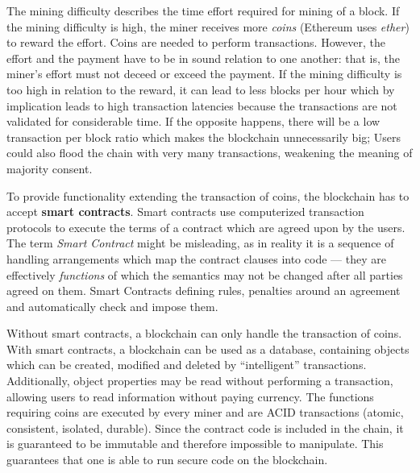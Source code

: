The mining difficulty describes the time effort required for mining of a block.
If the mining difficulty is high, the miner receives more \emph{coins} (Ethereum uses \emph{ether}) to reward the effort.
Coins are needed to perform transactions.
However, the effort and the payment have to be in sound relation to one another: that is, the miner's effort must not deceed or exceed the payment.
If the mining difficulty is too high in relation to the reward, it can lead to less blocks per hour which by implication leads to high transaction latencies because the transactions are not validated for considerable time.
If the opposite happens, there will be a low transaction per block ratio which makes the blockchain unnecessarily big; Users could also flood the chain with very many transactions, weakening the meaning of majority consent.\newline\newline

To provide functionality extending the transaction of coins, the blockchain has to accept \textbf{smart contracts}.
Smart contracts use computerized transaction protocols to execute the terms of a contract which are agreed upon by the users.
The term \emph{Smart Contract} might be misleading, as in reality it is a sequence of handling arrangements which map the contract clauses into code \cite{ecolex} --- they are effectively \emph{functions} of which the semantics may not be changed after all parties agreed on them.
Smart Contracts defining rules, penalties around an agreement and automatically check and impose them.

Without smart contracts, a blockchain can only handle the transaction of coins.
With smart contracts, a blockchain can be used as a database, containing objects which can be created, modified and deleted by \enquote{intelligent} transactions.
Additionally, object properties may be read without performing a transaction, allowing users to read information without paying currency.
The functions requiring coins are executed by every miner and are ACID transactions (atomic, consistent, isolated, durable).
Since the contract code is included in the chain, it is guaranteed to be immutable and therefore impossible to manipulate.
This guarantees that one is able to run secure code on the blockchain.

